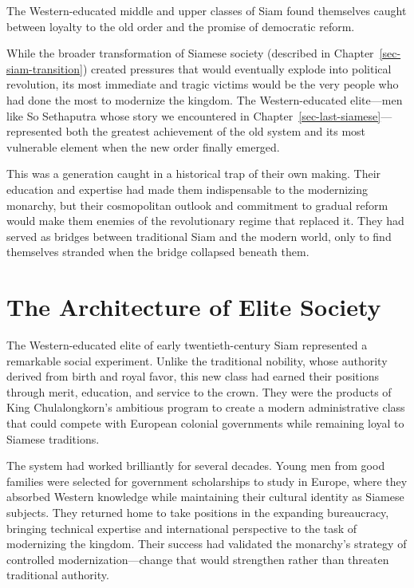 \documentclass[
  Letterpaper,
]{scrbook}
\begin{document}
The Western-educated middle and upper classes of Siam found themselves
caught between loyalty to the old order and the promise of democratic
reform.

While the broader transformation of Siamese society (described in
Chapter~\ref{sec-siam-transition}) created pressures that would
eventually explode into political revolution, its most immediate and
tragic victims would be the very people who had done the most to
modernize the kingdom. The Western-educated elite---men like So
Sethaputra whose story we encountered in
Chapter~\ref{sec-last-siamese}---represented both the greatest
achievement of the old system and its most vulnerable element when the
new order finally emerged.

This was a generation caught in a historical trap of their own making.
Their education and expertise had made them indispensable to the
modernizing monarchy, but their cosmopolitan outlook and commitment to
gradual reform would make them enemies of the revolutionary regime that
replaced it. They had served as bridges between traditional Siam and the
modern world, only to find themselves stranded when the bridge collapsed
beneath them.

\section{The Architecture of Elite
Society}\label{the-architecture-of-elite-society}

The Western-educated elite of early twentieth-century Siam represented a
remarkable social experiment. Unlike the traditional nobility, whose
authority derived from birth and royal favor, this new class had earned
their positions through merit, education, and service to the crown. They
were the products of King Chulalongkorn's ambitious program to create a
modern administrative class that could compete with European colonial
governments while remaining loyal to Siamese traditions.

The system had worked brilliantly for several decades. Young men from
good families were selected for government scholarships to study in
Europe, where they absorbed Western knowledge while maintaining their
cultural identity as Siamese subjects. They returned home to take
positions in the expanding bureaucracy, bringing technical expertise and
international perspective to the task of modernizing the kingdom. Their
success had validated the monarchy's strategy of controlled
modernization---change that would strengthen rather than threaten
traditional authority.
\end{document}
